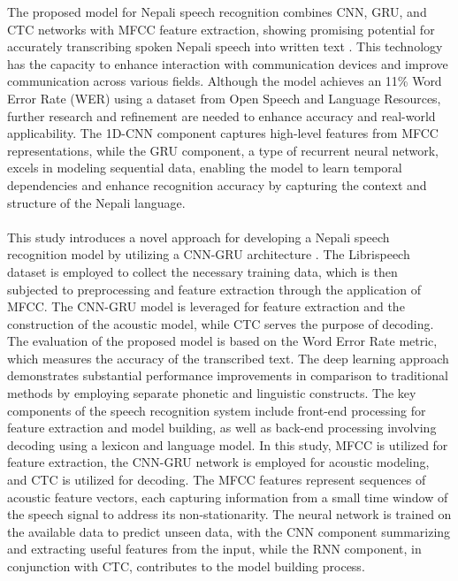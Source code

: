 	The proposed model for Nepali speech recognition combines CNN, GRU, and CTC networks with MFCC feature extraction, showing promising potential for accurately transcribing spoken Nepali speech into written text	 \cite{bhatta2020nepali}. This technology has the capacity to enhance interaction with communication devices and improve communication across various fields. Although the model achieves an 11\% Word Error Rate (WER) using a dataset from Open Speech and Language Resources, further research and refinement are needed to enhance accuracy and real-world applicability. The 1D-CNN component captures high-level features from MFCC representations, while the GRU component, a type of recurrent neural network, excels in modeling sequential data, enabling the model to learn temporal dependencies and enhance recognition accuracy by capturing the context and structure of the Nepali language.
	\\
	\\
	This study introduces a novel approach for developing a Nepali speech recognition model by utilizing a CNN-GRU architecture \cite{joshi2022novel}. The Librispeech dataset is employed to collect the necessary training data, which is then subjected to preprocessing and feature extraction through the application of MFCC. The CNN-GRU model is leveraged for feature extraction and the construction of the acoustic model, while CTC serves the purpose of decoding. The evaluation of the proposed model is based on the Word Error Rate metric, which measures the accuracy of the transcribed text. The deep learning approach demonstrates substantial performance improvements in comparison to traditional methods by employing separate phonetic and linguistic constructs. The key components of the speech recognition system include front-end processing for feature extraction and model building, as well as back-end processing involving decoding using a lexicon and language model. In this study, MFCC is utilized for feature extraction, the CNN-GRU network is employed for acoustic modeling, and CTC is utilized for decoding. The MFCC features represent sequences of acoustic feature vectors, each capturing information from a small time window of the speech signal to address its non-stationarity. The neural network is trained on the available data to predict unseen data, with the CNN component summarizing and extracting useful features from the input, while the RNN component, in conjunction with CTC, contributes to the model building process.

